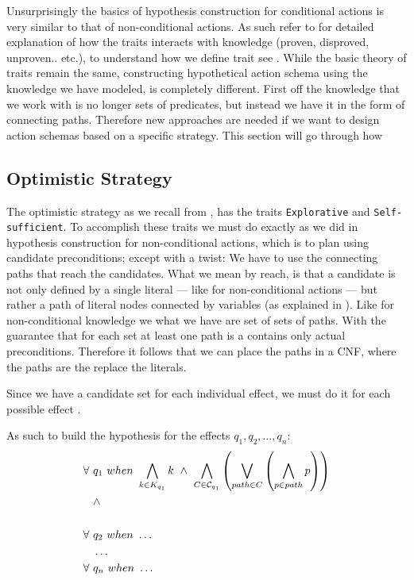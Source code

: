 \documentclass[\master/Master.tex]{subfiles}
\begin{document}
  	Unsurprisingly the basics of hypothesis construction for conditional actions is very similar to that of non-conditional actions. 
  	As such refer to  for detailed explanation of how the traits interacts with knowledge (proven, disproved, unproven.. etc.), to understand how we define trait see .
  	While the basic theory of traits remain the same, constructing hypothetical action schema using the knowledge we have modeled, is completely different. First off the knowledge that we work with is no longer sets of predicates, but instead we have it in the form of connecting paths.
  	Therefore new approaches are needed if we want to design action schemas based on a specific strategy.
  	This section will go through how 
  	 	
  	\subsection{Optimistic Strategy}
  	The optimistic strategy as we recall from , has the traits \texttt{Explorative} and \texttt{Self-sufficient}.
  	To accomplish these traits we must do exactly as we did in hypothesis construction for non-conditional actions, 
  	which is to plan using candidate preconditions; except with a twist: 
  	We have to use the connecting paths that reach the candidates.
  	What we mean by reach, is that a candidate is not only defined by a single literal --- like for non-conditional actions --- but rather a path of literal nodes connected by variables (as explained in ). 
  	Like for non-conditional knowledge we what we have are set of sets of paths. With the guarantee that for each set at least one path is a contains only actual preconditions. Therefore it follows that we can place the paths in a CNF, where the paths are the replace the literals.
  	
  	Since we have a candidate set for each individual effect, we must do it for each possible effect \preds.
  	
  	As such to build the hypothesis for the effects $q_1,q_2,\dots,q_n$:  	
  	\begin{equation} \label{eq:ca:opt-preconds}
  	\begin{split}  	
  	\forall ~& q_1 ~ when ~ \bigwedge\limits_{k \in K_{q_1}} k ~ \land ~ 
  	\bigwedge \limits_{C \in \mathcal{C}_{q_1} } \left( \bigvee \limits_{path \in C} \left( \bigwedge \limits_{p \in path} p\right)\right)
  	\\
  	& \land \\
  	\\
  	\forall ~& q_2 ~ when ~  \dots \\
  	&\dots \\
  	\forall ~& q_n ~ when ~  \dots
  	\end{split}  	
  	\end{equation}
  	
\end{document}
